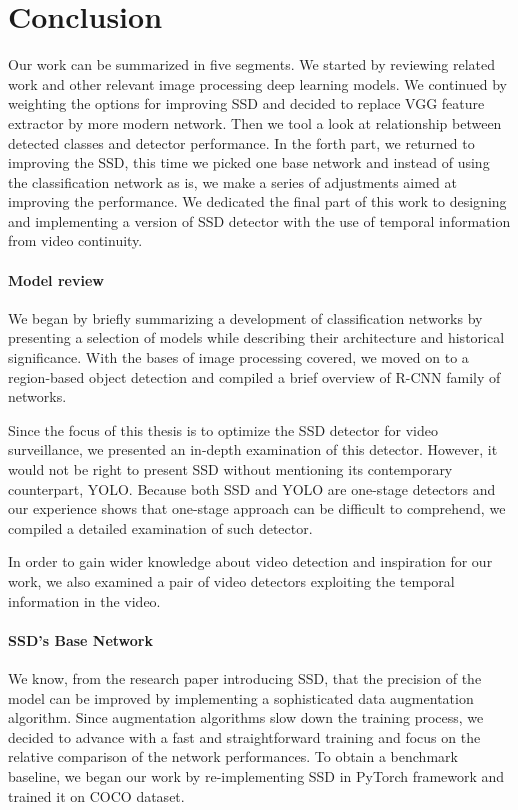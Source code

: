 \chapter*{Conclusion}

Our work can be summarized in five segments. We started by reviewing related work and other relevant image processing deep learning models. We continued by weighting the options for improving SSD and decided to replace VGG feature extractor by more modern network. Then we tool a look at relationship between detected classes and detector performance. In the forth part, we returned to improving the SSD, this time we picked one base network and instead of using the classification network as is, we make a series of adjustments aimed at improving the performance. We dedicated the final part of this work to designing and implementing a version of SSD detector with the use of temporal information from video continuity.

\subsubsection*{Model review}
We began by briefly summarizing a development of classification networks by presenting a selection of models while describing their architecture and historical significance. With the bases of image processing covered, we moved on to a region-based object detection and compiled a brief overview of R-CNN family of networks.

Since the focus of this thesis is to optimize the SSD detector for video surveillance, we presented an in-depth examination of this detector. However, it would not be right to present SSD without mentioning its contemporary counterpart, YOLO. Because both SSD and YOLO are one-stage detectors and our experience shows that one-stage approach can be difficult to comprehend, we compiled a detailed examination of such detector.

In order to gain wider knowledge about video detection and inspiration for our work, we also examined a pair of video detectors exploiting the temporal information in the video.

\subsubsection*{SSD's Base Network}
We know, from the research paper introducing SSD, that the precision of the model can be improved by implementing a sophisticated data augmentation algorithm. Since augmentation algorithms slow down the training process, we decided to advance with a fast and straightforward training and focus on the relative comparison of the network performances. To obtain a benchmark baseline, we began our work by re-implementing SSD in PyTorch framework and trained it on COCO dataset.


